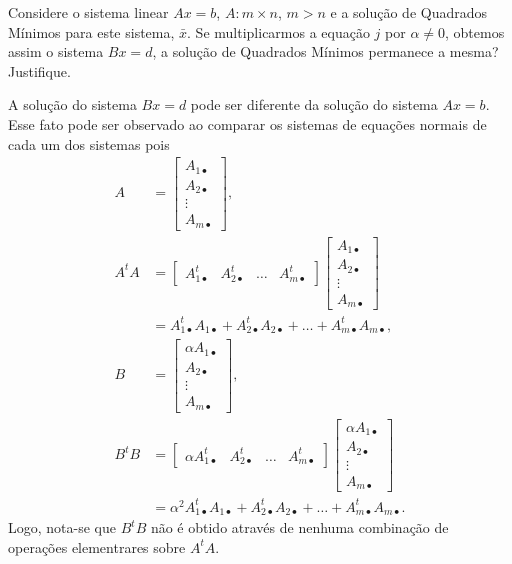 \documentclass[a4paper,12pt, leqno, answers]{exam}
\newcommand{\mdot}{\bullet}
\begin{document}
\begin{questions}
    \question Considere o sistema linear $A x = b$, $A : m \times n$, $m > n$ e a solu\c{c}\~{a}o de Quadrados M\'{i}nimos para este sistema, $\bar{x}$. Se multiplicarmos a equa\c{c}\~{a}o $j$ por $\alpha \neq 0$, obtemos assim o sistema $B x = d$, a solu\c{c}\~{a}o de Quadrados M\'{i}nimos permanece a mesma? Justifique.
    \begin{solution}
        A solu\c{c}\~{a}o do sistema $B x = d$ pode ser diferente da solu\c{c}\~{a}o do sistema $A x = b$. Esse fato pode ser observado ao comparar os sistemas de equa\c{c}\~{o}es normais de cada um dos sistemas pois
        \begin{align*}
            A &= \begin{bmatrix}
                A_{1 \mdot} \\
                A_{2 \mdot} \\
                \vdots \\
                A_{m \mdot}
            \end{bmatrix}, \\
            A^t A &= \begin{bmatrix}
                A_{1 \mdot}^t & A_{2 \mdot}^t & \ldots & A_{m \mdot}^t
            \end{bmatrix} \begin{bmatrix}
                A_{1 \mdot} \\
                A_{2 \mdot} \\
                \vdots \\
                A_{m \mdot}
            \end{bmatrix} \\
            &= A_{1 \mdot}^t A_{1 \mdot} + A_{2 \mdot}^t A_{2 \mdot} + \ldots + A_{m \mdot}^t A_{m \mdot}, \\
            B &= \begin{bmatrix}
                \alpha A_{1 \mdot} \\
                A_{2 \mdot} \\
                \vdots \\
                A_{m \mdot}
            \end{bmatrix}, \\
            B^t B &= \begin{bmatrix}
                \alpha A_{1 \mdot}^t & A_{2 \mdot}^t & \ldots & A_{m \mdot}^t
            \end{bmatrix} \begin{bmatrix}
                \alpha A_{1 \mdot} \\
                A_{2 \mdot} \\
                \vdots \\
                A_{m \mdot}
            \end{bmatrix} \\
            &= \alpha^2 A_{1 \mdot}^t A_{1 \mdot} + A_{2 \mdot}^t A_{2 \mdot} + \ldots + A_{m \mdot}^t A_{m \mdot}.
        \end{align*}
        Logo, nota-se que $B^t B$ n\~{a}o \'{e} obtido atrav\'{e}s de nenhuma combina\c{c}\~{a}o de opera\c{c}\~{o}es elementrares sobre $A^t A$.
    \end{solution}


\end{questions}
\end{document}
